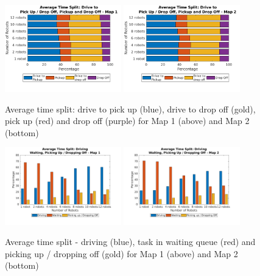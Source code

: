 \documentclass[journal]{IEEEtran}
\begin{document}
\begin{figure}[h]
	\centering
	\includegraphics[width=0.45\textwidth]{resources/Graphs-paper/graph3_1.png}
	\includegraphics[width=0.45\textwidth]{resources/Graphs-paper/graph3_2.png}
	\caption{Average time split: drive to pick up (blue), drive to drop off (gold), pick up (red) and drop off (purple) for Map 1 (above) and Map 2 (bottom)}
	\label{fig:drive_pickup_dropoff}
\end{figure}

\begin{figure}[h]
	\centering
	\includegraphics[width=0.45\textwidth]{resources/Graphs-paper/graph4_1.png}
	\label{fig:trans_charg_idle}
	\includegraphics[width=0.45\textwidth]{resources/Graphs-paper/graph4_2.png}
	\caption{Average time split - driving (blue), task in waiting queue (red) and picking up / dropping off (gold)  for Map 1 (above) and Map 2 (bottom)}
	\label{fig:delivery_time2}
\end{figure}
\end{document}
